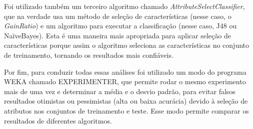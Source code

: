 Foi utilizado também um terceiro algoritmo chamado \textit{AttributeSelectClassifier}, que na verdade usa um método de seleção de características (nesse caso, o \textit{GainRatio}) e um algoritmo para executar a classificação (nesse caso, J48 ou NaïveBayes). Esta é uma maneira mais apropriada para aplicar seleção de características porque assim o algoritmo seleciona as características no conjunto de treinamento, tornando os resultados mais confiáveis.

Por fim, para conduzir todas essas análises foi utilizado um modo do programa WEKA chamado EXPERIMENTER, que permite rodar o mesmo experimento mais de uma vez e determinar a média e o desvio padrão, para evitar falsos resultados otimistas ou pessimistas (alta ou baixa acurácia) devido à seleção de atributos nos conjuntos de treinamento e teste. Esse modo permite comparar os resultados de diferentes algoritmos.






















